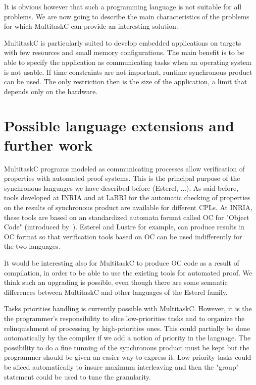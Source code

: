 \documentclass[10pt]{report}
\begin{document}
It is obvious however that such a programming language is not suitable for all problems. We are now going to describe the main 
characteristics of the problems for which MultitaskC can provide an interesting solution.

MultitaskC is particularly suited to develop embedded applications on targets with few resources and small
memory configurations. The main benefit is to be able to specify the application as communicating tasks when an operating
system is not usable. If time constraints are not important, runtime synchronous product can be used. The only restriction 
then is the size of the application, a limit that depends only on the hardware.

\section{Possible language extensions and further work}

MultitaskC programs modeled as communicating processes allow verification of properties with automated proof systems. This
is the principal purpose of the synchronous languages we have described before (Esterel, ...). As said before, 
tools developed at INRIA and at LaBRI for the automatic checking of properties on the results of synchronous
product are available for different CPLs. At INRIA, these tools are based on an standardized automata format called OC 
for "Object Code" (introduced by~\cite{Halbwachs:91}). Esterel and Lustre for example, can produce results in OC format 
so that verification tools based on OC can be used indifferently for the two languages.

It would be interesting also for MultitaskC to produce OC code as a result of compilation, in order to be able to use
the existing tools for automated proof. We think such an upgrading is possible, even though there are some semantic 
differences between MultitaskC and other languages of the Esterel family.

Tasks priorities handling is currently possible with MultitaskC. However, it is the the programmer's responsibility to slice 
low-priorities tasks and to organize the relinquishment of processing by high-priorities ones. This could partially be done 
automatically by the compiler if we add a notion of priority in the language. The possibility to do a fine tunning of the 
synchronous product must be kept but the programmer should be given an easier way to express it. Low-priority tasks could be 
sliced automatically to insure maximum interleaving and then the "group" statement could be used to tune the granularity.
\end{document}
